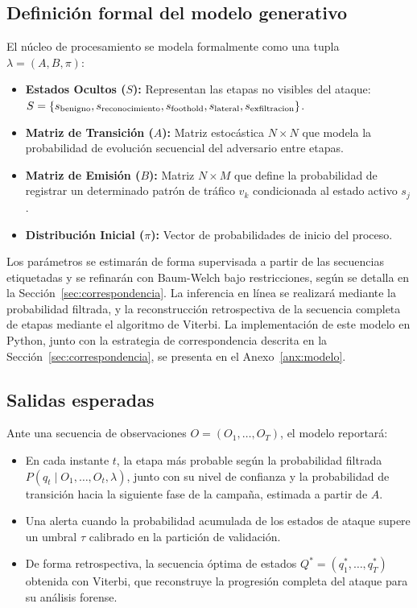 \subsection{Definición formal del modelo generativo}
\label{sec:modelo_formal}
El núcleo de procesamiento se modela formalmente como una tupla $\lambda = (A, B, \pi)$:
\begin{itemize}
    \item \textbf{Estados Ocultos ($S$):} Representan las etapas no visibles del ataque: $S = \{s_{\text{benigno}}, s_{\text{reconocimiento}}, \newline s_{\text{foothold}}, s_{\text{lateral}}, s_{\text{exfiltracion}}\}$.
    \item \textbf{Matriz de Transición ($A$):} Matriz estocástica $N \times N$ que modela la probabilidad de evolución secuencial del adversario entre etapas.
    \item \textbf{Matriz de Emisión ($B$):} Matriz $N \times M$ que define la probabilidad de registrar un determinado patrón de tráfico $v_k$ condicionada al estado activo $s_j$.
    \item \textbf{Distribución Inicial ($\pi$):} Vector de probabilidades de inicio del proceso.
\end{itemize}
Los parámetros se estimarán de forma supervisada a partir de las secuencias etiquetadas y se refinarán con Baum-Welch bajo restricciones, según se detalla en la Sección~\ref{sec:correspondencia}. La inferencia en línea se realizará mediante la probabilidad filtrada, y la reconstrucción retrospectiva de la secuencia completa de etapas mediante el algoritmo de Viterbi. La implementación de este modelo en Python, junto con la estrategia de correspondencia descrita en la Sección~\ref{sec:correspondencia}, se presenta en el Anexo~\ref{anx:modelo}.

\subsection{Salidas esperadas}
Ante una secuencia de observaciones $O = (O_1, \dots, O_T)$, el modelo reportará:
\begin{itemize}
    \item En cada instante $t$, la etapa más probable según la probabilidad filtrada $P(q_t \mid O_1, \dots, O_t, \lambda)$, junto con su nivel de confianza y la probabilidad de transición hacia la siguiente fase de la campaña, estimada a partir de $A$.
    \item Una alerta cuando la probabilidad acumulada de los estados de ataque supere un umbral $\tau$ calibrado en la partición de validación.
    \item De forma retrospectiva, la secuencia óptima de estados $Q^* = (q_1^*, \dots, q_T^*)$ obtenida con Viterbi, que reconstruye la progresión completa del ataque para su análisis forense.
\end{itemize}

